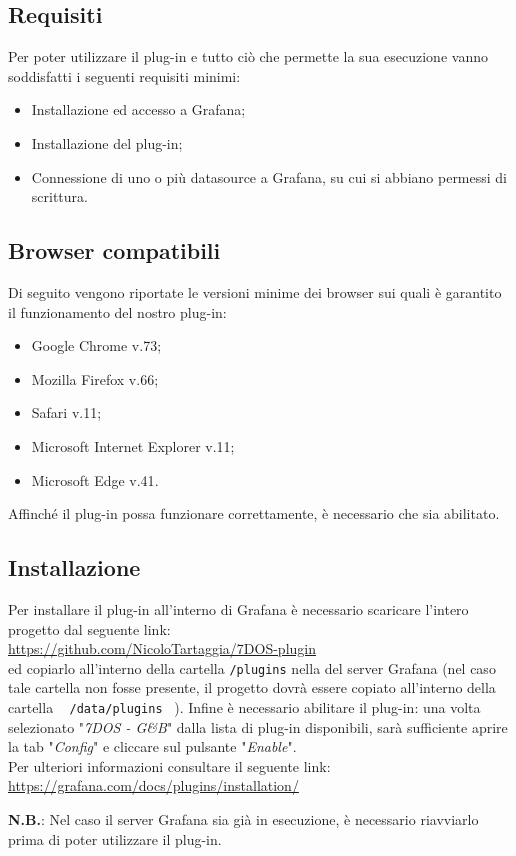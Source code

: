 \subsection{Requisiti}
Per poter utilizzare il plug-in e tutto ciò che permette la sua esecuzione vanno soddisfatti i seguenti requisiti minimi:
\begin{itemize}
	\item{Installazione ed accesso a Grafana;}
	\item{Installazione del plug-in;}
	\item{Connessione di uno o più datasource a Grafana, su cui si abbiano permessi di scrittura.}
\end{itemize}
\subsection{Browser compatibili}
Di seguito vengono riportate le versioni minime dei browser sui quali è garantito il funzionamento del nostro plug-in:
\begin{itemize}
	\item{Google Chrome v.73};
	\item{Mozilla Firefox v.66};
	\item{Safari v.11};
	\item{Microsoft Internet Explorer v.11};
	\item{Microsoft Edge v.41}. 
\end{itemize}
Affinché il plug-in possa funzionare correttamente, è necessario che  sia abilitato.
\subsection{Installazione}
Per installare il plug-in all'interno di Grafana è necessario scaricare l'intero progetto dal seguente link: \\[0.2cm]
\hspace*{10mm}\url{https://github.com/NicoloTartaggia/7DOS-plugin}\\[0.2cm]
ed copiarlo all'interno della cartella \texttt{/plugins} nella  del server Grafana (nel caso tale cartella non fosse presente, il progetto dovrà essere copiato all'interno della cartella ~ \texttt{/data/plugins} ~).
Infine è necessario abilitare il plug-in: una volta selezionato "\textit{7DOS - G\&B}" dalla lista di plug-in disponibili, sarà sufficiente aprire la tab "\textit{Config}" e cliccare sul pulsante "\textit{Enable}".\\
Per ulteriori informazioni consultare il seguente link:\\[0.2cm]
\hspace*{10mm}
\url{https://grafana.com/docs/plugins/installation/}

\textbf{N.B.}: Nel caso il server Grafana sia già in esecuzione, è necessario riavviarlo prima di poter utilizzare il plug-in.
\pagebreak
